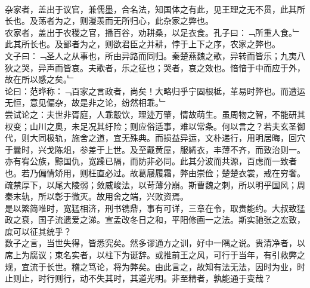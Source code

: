 \\
杂家者，盖出于议官，兼儒墨，合名法，知国体之有此，见王理之无不贯，此其所长也。及荡者为之，则漫羡而无所归心，此杂家之弊也。\\
农家者，盖出于农稷之官，播百谷，劝耕桑，以足衣食。孔子曰：﹁所重人食。﹂此其所长也。及鄙者为之，则欲君臣之并耕，悖于上下之序，农家之弊也。
\\
文子曰：﹁圣人之从事也，所由异路而同归。秦楚燕魏之歌，异转而皆乐；九夷八狄之哭，异声而皆哀。夫歌者，乐之征也；哭者，哀之效也。愔愔于中而应于外，故在所以感之矣。﹂\\
论曰：范晔称：﹁百家之言政者，尚矣！大略归乎宁固根柢，革易时弊也。而遭运无恒，意见偏杂，故是非之论，纷然相乖。﹂\\
尝试论之：夫世非胥庭，人乖鷇饮，理迹万肇，情故萌生。虽周物之智，不能研其权变；山川之奥，未足况其纡险；则应俗适事，难以常条。何以言之？若夫玄圣御代，则大同极轨，施舍之道，宜无殊典。而损益异运，文朴递行，用明居晦，回穴于曩时，兴戈陈俎，参差于上世。及至戴黄屋，服絺衣，丰薄不齐，而致治则一。亦有宥公族，黥国仇，宽躁已隔，而防非必同。此其分波而共源，百虑而一致者也。若乃偏情矫用，则枉直必过。故葛屦履霜，弊由崇俭；楚楚衣裳，戒在穷奢。疏禁厚下，以尾大陵弱；敛威峻法，以苛薄分崩。斯曹魏之刺，所以明乎国风；周秦末轨，所以彰于微灭。故用舍之端，兴败资焉。\\
是以繁简唯时，宽猛相济，刑书镌鼎，事有可详，三章在令，取贵能约。大叔致猛政之衰，国子流遗爱之涕。宣孟改冬日之和，平阳修画一之法。斯实驰张之宏致，庶可以征其统乎？\\
数子之言，当世失得，皆悉究矣。然多谬通方之训，好中一隅之说。贵清净者，以席上为腐议；束名实者，以柱下为诞辞。或推前王之风，可行于当年，有引救弊之规，宜流于长世。稽之笃论，将为弊矣。由此言之，故知有法无法，因时为业，时止则止，时行则行，动不失其时，其道光明。非至精者，孰能通于变哉？
%
%
